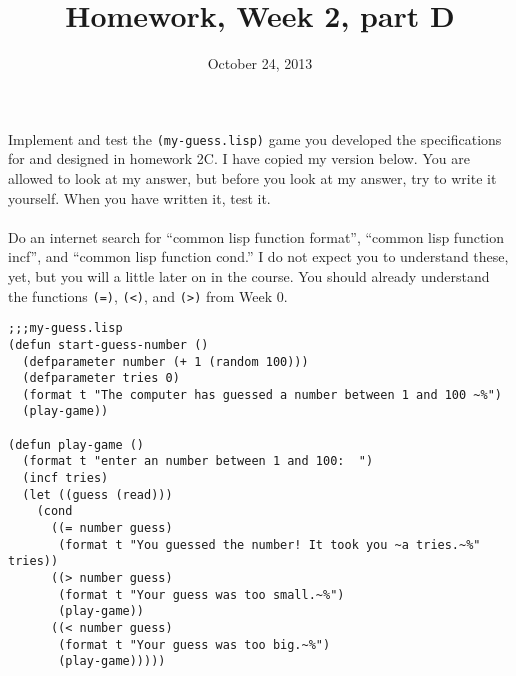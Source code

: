\documentclass{article}
\title{Homework, Week 2, part D}
\date{October 24, 2013}
\begin{document}
\maketitle{}

\paragraph{}Implement and test the \texttt{(my-guess.lisp)} game you developed the specifications for and designed in homework 2C. I have copied my version below. You are allowed to look at my answer, but before you look at my answer, try to write it yourself. When you have written it, test it.

\paragraph{}Do an internet search for ``common lisp function format'', ``common lisp function incf'', and ``common lisp function cond.'' I do not expect you to understand these, yet, but you will a little later on in the course. You should already understand the functions \texttt{(=)}, \texttt{(<)}, and \texttt{(>)} from Week 0.

\lstset{language=Lisp,numbers=left,keepspaces=true,basicstyle=\small,numberstyle=\tiny,showstringspaces=false,breaklines=true}
\begin{lstlisting}
;;;my-guess.lisp
(defun start-guess-number ()
  (defparameter number (+ 1 (random 100)))
  (defparameter tries 0)
  (format t "The computer has guessed a number between 1 and 100 ~%")
  (play-game))

(defun play-game ()
  (format t "enter an number between 1 and 100:  ")
  (incf tries)
  (let ((guess (read)))
    (cond
      ((= number guess)
       (format t "You guessed the number! It took you ~a tries.~%" tries))
      ((> number guess)
       (format t "Your guess was too small.~%")
       (play-game))
      ((< number guess)
       (format t "Your guess was too big.~%")
       (play-game)))))
\end{lstlisting}
\end{document}
